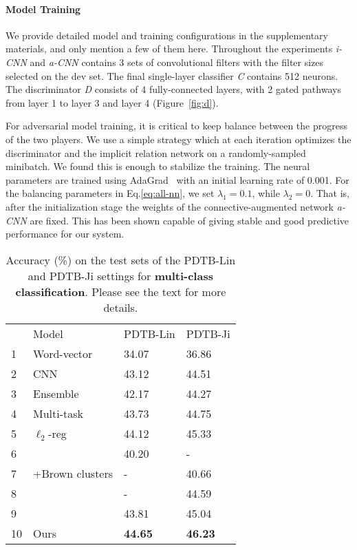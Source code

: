 \documentclass[11pt,a4paper]{article}
\begin{document}
\paragraph{Model Training}
We provide detailed model and training configurations in the supplementary materials, and only mention a few of them here. Throughout the experiments {\it i-CNN} and {\it a-CNN} contains 3 sets of convolutional filters with the filter sizes selected on the dev set.
The final single-layer classifier {\it C} contains 512 neurons. The discriminator {\it D} consists of 4 fully-connected layers, with 2 gated pathways from layer 1 to layer 3 and layer 4 (Figure~\ref{fig:d}).

For adversarial model training, it is critical to keep balance between the progress of the two players. We use a simple strategy which at each iteration optimizes the discriminator and the implicit relation network on a randomly-sampled minibatch. We found this is enough to stabilize the training.  The neural parameters are trained using AdaGrad~\cite{duchi2011adaptive} with an initial learning rate of 0.001. For the balancing parameters in Eq.\eqref{eq:all-nn}, we set $\lambda_1=0.1$, while $\lambda_2=0$. That is, after the initialization stage the weights of the connective-augmented network {\it a-CNN} are fixed. This has been shown capable of giving stable and good predictive performance for our system.

\begin{table*}[!h]
  \centering
 \small
\begin{tabular}{l L{6.2cm} L{2cm} L{1.5cm} } 
&Model&PDTB-Lin&PDTB-Ji\\
1 & Word-vector &34.07 &36.86\\
2 & CNN & 43.12 &44.51\\
3 & Ensemble & 42.17 & 44.27\\
4 & Multi-task&43.73&44.75\\
5 & $\ell_2$-reg&44.12&45.33\\
6 & &40.20&-\\
7 &+Brown clusters&-&40.66\\
8 &&-&44.59\\
9 &&43.81&45.04\\
10 & Ours&\textbf{44.65}&\textbf{46.23}\\
\end{tabular}
\caption{Accuracy (\%) on the test sets of the PDTB-Lin and PDTB-Ji settings for \textbf{multi-class classification}. Please see the text for more details.} 
\label{tab:multi}
\end{table*}
\end{document}
